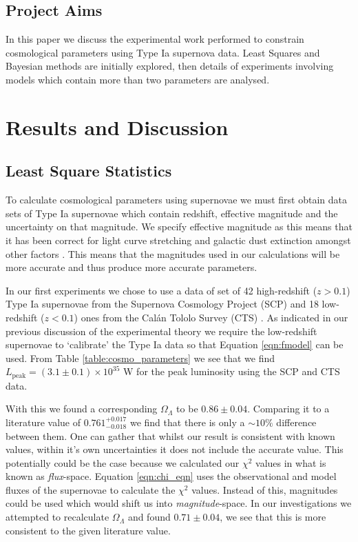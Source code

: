 \documentclass[twocolumn]{revtex4}
\begin{document}
\vspace{-4ex}
\subsection{Project Aims}
\vspace{-2ex}
In this paper we discuss the experimental work performed to constrain cosmological parameters using Type Ia supernova data. Least Squares and Bayesian methods are initially explored, then details of experiments involving models which contain more than two parameters are analysed.

\vspace{-3ex}
\section{Results and Discussion} 
\label{sec:results_discussion}
\vspace{-3ex}
\subsection{Least Square Statistics} 
\vspace{-2ex}
To calculate cosmological parameters using supernovae we must first obtain data sets of Type Ia supernovae which contain redshift, effective magnitude and the uncertainty on that magnitude. We specify effective magnitude as this means that it has been correct for light curve stretching and galactic dust extinction amongst other factors \cite{script}. This means that the magnitudes used in our calculations will be more accurate and thus produce more accurate parameters. 

In our first experiments we chose to use a data of set of 42 high-redshift ($z>0.1$) Type Ia supernovae from the Supernova Cosmology Project (SCP) and 18 low-redshift ($z<0.1$) ones from the Cal\'{a}n Tololo Survey (CTS) \cite{dataset_1}. As indicated in our previous discussion of the experimental theory we require the low-redshift supernovae to `calibrate' the Type Ia data so that Equation \ref{eqn:fmodel} can be used. From Table \ref{table:cosmo_parameters} we see that we find $L_{\text{peak}} = (3.1\pm0.1) \times 10^{35}$ W for the peak luminosity using the SCP and CTS data.

With this we found a corresponding $\Omega_\Lambda$ to be $0.86\pm0.04$. Comparing it to a literature value of $0.761^{+0.017}_{-0.018}$ \cite{cosmo_constraints} we find that there is only a $\sim 10 \%$ difference between them. One can gather that whilst our result is consistent with known values, within it's own uncertainties it does not include the accurate value. This potentially could be the case because we calculated our $\chi^2$ values in what is known as \textit{flux}-space. Equation \ref{eqn:chi_eqn} uses the observational and model fluxes of the supernovae to calculate the $\chi^2$ values. Instead of this, magnitudes could be used which would shift us into \textit{magnitude}-space. In our investigations we attempted to recalculate $\Omega_\Lambda$ and found $0.71\pm0.04$, we see that this is more consistent to the given literature value.
\end{document}
